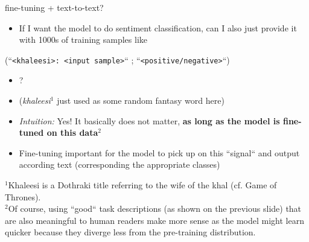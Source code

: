 
\begin{frame}{fine-tuning + text-to-text?}

\vfill

\begin{itemize}
	\item \ques If I want the model to do sentiment classification, can I also just provide it with 1000s of training samples like 
\end{itemize}

		\begin{center}
				{\small
					(``\texttt{<khaleesi>: <input sample>}`` ; ``\texttt{<positive/negative>}``)
				}
		\end{center}
				
\begin{itemize}
	\item[] ? 
	\item[] (\textit{khaleesi}$^1$ just used as some random fantasy word here)
	\pause
	\item \textit{Intuition:} Yes! It basically does not matter, \textbf{as long as the model is fine-tuned on this data}$^2$
	\item Fine-tuning important for the model to pick up on this ``signal`` and output according text (corresponding the appropriate classes)
\end{itemize}

\vfill

$^1$\footnotesize{Khaleesi is a Dothraki title referring to the wife of the khal (cf. Game of Thrones).}\\
$^2$\footnotesize{Of course, using ``good`` task descriptions (as shown on the previous slide) that are also meaningful to human readers make more sense as the model might learn quicker because they diverge less from the pre-training distribution.}

\end{frame}


